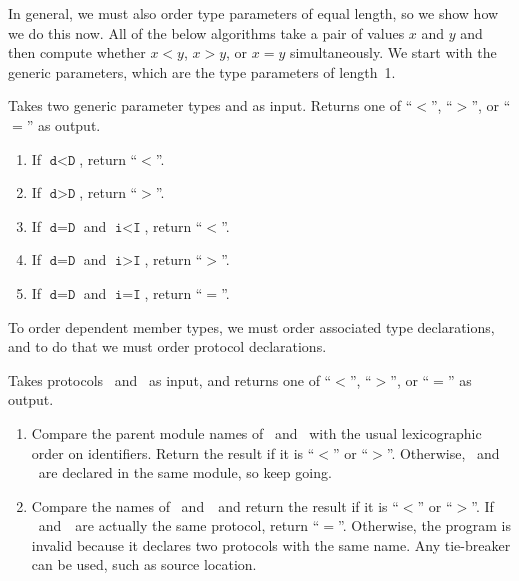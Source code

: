 \documentclass[../generics]{subfiles}
\begin{document}
In general, we must also order type parameters of equal length, so we show how we do this now. All of the below algorithms take a pair of values $x$ and $y$ and then compute whether $x<y$, $x>y$, or $x=y$ simultaneously. We start with the generic parameters, which are the type parameters of length~1.

\begin{algorithm}\label{generic parameter order} Takes two generic parameter types  and  as input. Returns one of ``$<$'', ``$>$'', or ``$=$'' as output.
\begin{enumerate}
\item If $\texttt{d}<\texttt{D}$, return ``$<$''.
\item If $\texttt{d}>\texttt{D}$, return ``$>$''.
\item If $\texttt{d}=\texttt{D}$ and $\texttt{i}<\texttt{I}$, return ``$<$''.
\item If $\texttt{d}=\texttt{D}$ and $\texttt{i}>\texttt{I}$, return ``$>$''.
\item If $\texttt{d}=\texttt{D}$ and $\texttt{i}=\texttt{I}$, return ``$=$''.
\end{enumerate}
\end{algorithm}

To order dependent member types, we must order associated type declarations, and to do that we must order protocol declarations.

\begin{algorithm}\label{linear protocol order} Takes protocols \tP\ and \tQ\ as input, and returns one of ``$<$'', ``$>$'', or ``$=$'' as output.
\begin{enumerate}
\item Compare the parent module names of \tP\ and \tQ\ with the usual lexicographic order on identifiers. Return the result if it is ``$<$'' or ``$>$''. Otherwise, \tP\ and \tQ\ are declared in the same module, so keep going.
\item Compare the names of \tP\ and~\tQ\ and return the result if it is ``$<$'' or ``$>$''. If \tP~and~\tQ\ are actually the same protocol, return ``$=$''. Otherwise, the program is invalid because it declares two protocols with the same name. Any tie-breaker can be used, such as source location.
\end{enumerate}
\end{algorithm}
\end{document}
